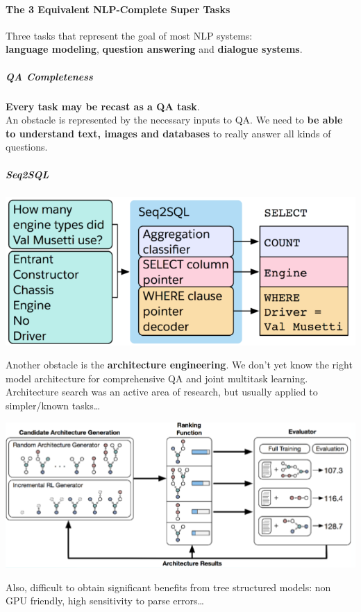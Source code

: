\documentclass[10pt]{report}
\begin{document}
\paragraph{The 3 Equivalent NLP-Complete Super Tasks} Three tasks that represent the goal of most NLP systems:\\
\textbf{language modeling}, \textbf{question answering} and \textbf{dialogue systems}.
\subparagraph{QA Completeness} \textbf{Every task may be recast as a QA task}.\\
An obstacle is represented by the necessary inputs to QA. We need to \textbf{be able to understand text, images and databases} to really answer all kinds of questions.
\subparagraph{Seq2SQL}
\begin{center}
	\includegraphics[scale=0.5]{142.png}
\end{center}
Another obstacle is the \textbf{architecture engineering}. We don't yet know the right model architecture for comprehensive QA and joint multitask learning. Architecture search was an active area of research, but usually applied to simpler/known tasks\ldots
\begin{center}
	\includegraphics[scale=0.5]{143.png}
\end{center}
Also, difficult to obtain significant benefits from tree structured models: non GPU friendly, high sensitivity to parse errors\ldots
\end{document}
